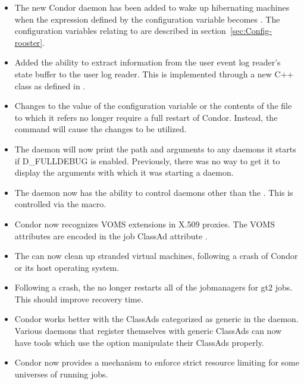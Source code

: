 \begin{itemize}
\item The new Condor daemon  has been added to wake up
hibernating machines when the expression defined by the configuration variable
 becomes .
The configuration variables relating to 
are described in section~\ref{sec:Config-rooster}.

\item Added the ability to extract information from the user event log
  reader's state buffer to the user log reader.  This is implemented
  through a new  C++ class
  as defined in .

\item Changes to the value of the configuration variable
 or the contents
of the file to which it refers no longer require a full restart of Condor.
Instead, the command  will cause the changes to be utilized.

\item The  daemon will now print the path and arguments
  to any daemons it starts if D\_FULLDEBUG is enabled.  Previously,
  there was no way to get it to display the arguments with which it
  was starting a daemon.

\item The  daemon now has the ability to control daemons
  other than the .  This is controlled via the
   macro.

\item Condor now recognizes VOMS extensions in X.509 proxies.
The VOMS attributes are encoded in the job ClassAd attribute
.

\item The  can now clean up stranded virtual machines,
following a crash of Condor or its host operating system.

\item Following a crash, the  no longer restarts all
of the jobmanagers for gt2 jobs. This should improve recovery time.

\item Condor works better with the ClassAds categorized as generic
in the  daemon.
Various daemons that register themselves with generic ClassAds
can now have tools which use the  option manipulate
their ClassAds properly.

\item Condor now provides a mechanism to enforce strict resource limiting for
some universes of running jobs.

\end{itemize}

